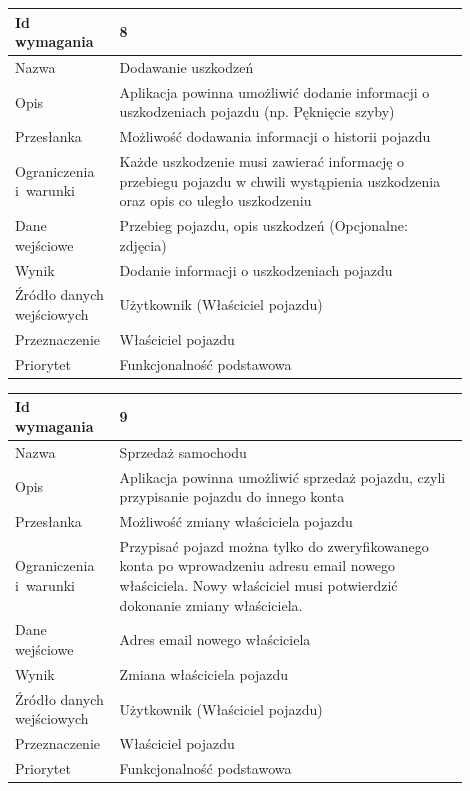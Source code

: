 \documentclass[12pt]{article}
\begin{document}
\begin{table}[H]
\begin{center}
	\begin{tabular}{|p{0.18\linewidth}|p{0.72\linewidth}|}%
	\hline
	Id wymagania 	& 8 				\\ \hline
	Nazwa			& Dodawanie uszkodzeń \\ \hline
	Opis &Aplikacja powinna umożliwić dodanie informacji o uszkodzeniach pojazdu (np. Pęknięcie szyby)\\ \hline
	Przesłanka & Możliwość dodawania informacji o historii pojazdu  \\ \hline
	Ograniczenia i~warunki & Każde uszkodzenie musi zawierać informację o przebiegu pojazdu w chwili wystąpienia uszkodzenia oraz opis co uległo uszkodzeniu \\ \hline
	Dane wejściowe &Przebieg pojazdu, opis uszkodzeń
(Opcjonalne: zdjęcia)\\ \hline
	Wynik & Dodanie informacji o uszkodzeniach pojazdu\\ \hline
	Źródło danych wejściowych &Użytkownik (Właściciel pojazdu)\\ \hline
Przeznaczenie & Właściciel pojazdu\\ \hline
Priorytet & Funkcjonalność podstawowa \\ \hline
	\end{tabular}
\end{center}
\end{table}


\begin{table}[H]
\begin{center}
	\begin{tabular}{|p{0.18\linewidth}|p{0.72\linewidth}|}%
	\hline
	Id wymagania 	& 9 				\\ \hline
	Nazwa			& Sprzedaż samochodu \\ \hline
	Opis &Aplikacja powinna umożliwić sprzedaż pojazdu, czyli przypisanie pojazdu do innego konta
\\ \hline
	Przesłanka & Możliwość zmiany właściciela pojazdu  \\ \hline
	Ograniczenia i~warunki & Przypisać pojazd można tylko do zweryfikowanego konta po wprowadzeniu adresu email nowego właściciela. Nowy właściciel musi potwierdzić dokonanie zmiany właściciela. \\ \hline
	Dane wejściowe &Adres email nowego właściciela \\ \hline
	Wynik & Zmiana właściciela pojazdu\\ \hline
	Źródło danych wejściowych &Użytkownik (Właściciel pojazdu)\\ \hline
	Przeznaczenie & Właściciel pojazdu\\ \hline
	Priorytet & Funkcjonalność podstawowa \\ \hline
	\end{tabular}
\end{center}
\end{table}
\end{document}
